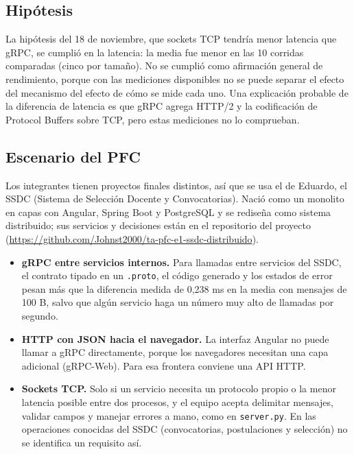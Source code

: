 \documentclass[11pt,a4paper]{article}
\begin{document}
\subsection{Hipótesis}

La hipótesis del 18 de noviembre, que sockets TCP tendría menor latencia que gRPC, se cumplió
en la latencia: la media fue menor en las 10 corridas comparadas (cinco por tamaño). No se
cumplió como afirmación general de rendimiento, porque con las mediciones disponibles no se
puede separar el efecto del mecanismo del efecto de cómo se mide cada uno. Una explicación
probable de la diferencia de latencia es que gRPC agrega HTTP/2 y la codificación de
Protocol Buffers sobre TCP, pero estas mediciones no lo comprueban.

\subsection{Escenario del PFC}

Los integrantes tienen proyectos finales distintos, así que se usa el de Eduardo, el SSDC
(Sistema de Selección Docente y Convocatorias). Nació como un monolito en capas con Angular,
Spring Boot y PostgreSQL y se rediseña como sistema distribuido; sus servicios y decisiones
están en el repositorio del proyecto
(\url{https://github.com/Johnst2000/ta-pfc-e1-ssdc-distribuido}).
\begin{itemize}
  \item \textbf{gRPC entre servicios internos.} Para llamadas entre servicios del SSDC, el
        contrato tipado en un \texttt{.proto}, el código generado y los estados de error
        pesan más que la diferencia medida de 0,238 ms en la media con mensajes de 100 B,
        salvo que algún servicio haga un número muy alto de llamadas por segundo.
  \item \textbf{HTTP con JSON hacia el navegador.} La interfaz Angular no puede llamar a gRPC
        directamente, porque los navegadores necesitan una capa adicional (gRPC-Web). Para
        esa frontera conviene una API HTTP.
  \item \textbf{Sockets TCP.} Solo si un servicio necesita un protocolo propio o la menor
        latencia posible entre dos procesos, y el equipo acepta delimitar mensajes, validar
        campos y manejar errores a mano, como en \texttt{server.py}. En las operaciones
        conocidas del SSDC (convocatorias, postulaciones y selección) no se identifica un
        requisito así.
\end{itemize}
\end{document}
